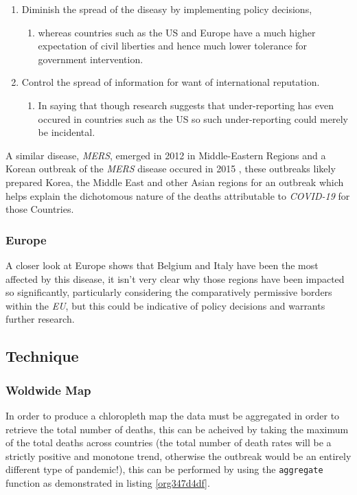 \documentclass[11pt]{article}
\begin{document}
\begin{enumerate}
\item Diminish the spread of the diseasy by implementing
policy decisions,
\begin{enumerate}
\item whereas countries such as the US and Europe have a much higher expectation
of civil liberties and hence much lower tolerance for government intervention.
\end{enumerate}
\item Control the spread of information for want of international reputation.
\begin{enumerate}
\item In saying that though research suggests that under-reporting has even
occured in countries such as the US \cite{sood2020} so such under-reporting
could merely be incidental.
\end{enumerate}
\end{enumerate}

A similar disease, \emph{MERS}, emerged in 2012 in Middle-Eastern Regions
\cite{woodley2020} and a Korean outbreak of the \emph{MERS} disease occured in 2015
\cite{serrano2015}, these outbreaks likely prepared Korea, the Middle East and
other Asian regions for an outbreak which helps explain the dichotomous
nature of the deaths attributable to \emph{COVID-19} for those Countries.

\subsubsection{Europe}
\label{sec:org86bbed3}
A closer look at Europe shows that Belgium and Italy have been the most affected
by this disease, it isn't very clear why those regions have been impacted so
significantly, particularly considering the comparatively permissive borders
within the \emph{EU}, but this could be indicative of policy decisions and warrants
further research.

\subsection{Technique}
\label{sec:orgcbda394}
\subsubsection{Woldwide Map}
\label{sec:org2fa4c82}
In order to produce a chloropleth map the data must be aggregated in order to retrieve the total number of
deaths, this can be acheived by taking the maximum of the total deaths across
countries (the total number of death rates will be a strictly positive and
monotone trend, otherwise the outbreak would be an entirely different type of
pandemic!), this can be performed by using the \texttt{aggregate} function as
demonstrated in listing \ref{org347d4df}.
\end{document}
